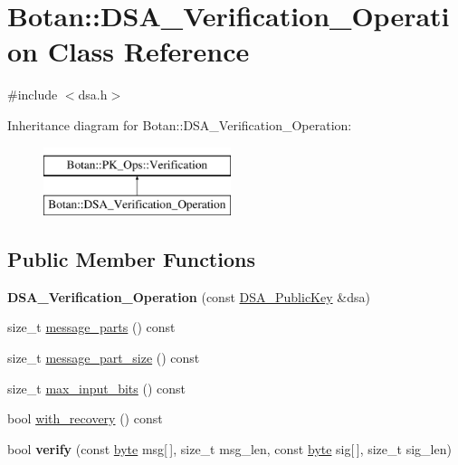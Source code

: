\hypertarget{classBotan_1_1DSA__Verification__Operation}{\section{Botan\-:\-:D\-S\-A\-\_\-\-Verification\-\_\-\-Operation Class Reference}
\label{classBotan_1_1DSA__Verification__Operation}
}


{\ttfamily \#include $<$dsa.\-h$>$}

Inheritance diagram for Botan\-:\-:D\-S\-A\-\_\-\-Verification\-\_\-\-Operation\-:\begin{figure}[H]
\begin{center}
\leavevmode
\includegraphics[height=2.000000cm]{classBotan_1_1DSA__Verification__Operation}
\end{center}
\end{figure}
\subsection*{Public Member Functions}
\begin{DoxyCompactItemize}
\item 
\hypertarget{classBotan_1_1DSA__Verification__Operation_a1a7f951b1467d44e5e4c84fc75c81c0f}{{\bfseries D\-S\-A\-\_\-\-Verification\-\_\-\-Operation} (const \hyperlink{classBotan_1_1DSA__PublicKey}{D\-S\-A\-\_\-\-Public\-Key} \&dsa)}\label{classBotan_1_1DSA__Verification__Operation_a1a7f951b1467d44e5e4c84fc75c81c0f}

\item 
size\-\_\-t \hyperlink{classBotan_1_1DSA__Verification__Operation_adcdc4bf069fd01ae6d9874bb033e0e5e}{message\-\_\-parts} () const 
\item 
size\-\_\-t \hyperlink{classBotan_1_1DSA__Verification__Operation_a970ea29b2c719848e9a9f5d46313b53f}{message\-\_\-part\-\_\-size} () const 
\item 
size\-\_\-t \hyperlink{classBotan_1_1DSA__Verification__Operation_a25a22aa4eb2519cb89291a59607bda79}{max\-\_\-input\-\_\-bits} () const 
\item 
bool \hyperlink{classBotan_1_1DSA__Verification__Operation_acb509b3e76cc20235a0fa86c9494a825}{with\-\_\-recovery} () const 
\item 
\hypertarget{classBotan_1_1DSA__Verification__Operation_a51825f19f6f4b3e3ed9637dc137c3f2b}{bool {\bfseries verify} (const \hyperlink{namespaceBotan_a7d793989d801281df48c6b19616b8b84}{byte} msg\mbox{[}$\,$\mbox{]}, size\-\_\-t msg\-\_\-len, const \hyperlink{namespaceBotan_a7d793989d801281df48c6b19616b8b84}{byte} sig\mbox{[}$\,$\mbox{]}, size\-\_\-t sig\-\_\-len)}\label{classBotan_1_1DSA__Verification__Operation_a51825f19f6f4b3e3ed9637dc137c3f2b}

\end{DoxyCompactItemize}


